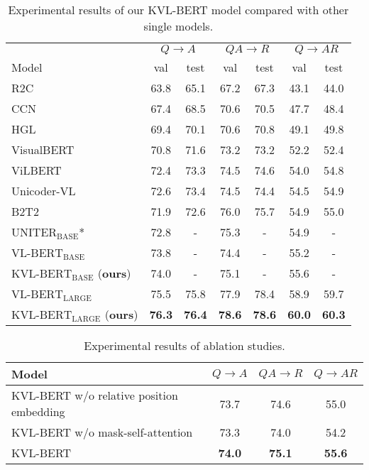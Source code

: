 \documentclass[conference]{IEEEtran}
\begin{document}
\begin{table*}[htp]
\setlength{\abovecaptionskip}{0pt}
\setlength{\belowcaptionskip}{10pt}
\caption{Experimental results of our KVL-BERT model compared with other single models.}
\centering
\begin{tabular}{l|cccccc}
\hline
 & \multicolumn{2}{c}{$Q \rightarrow A$} & \multicolumn{2}{c}{$QA \rightarrow R$} & \multicolumn{2}{c}{$Q \rightarrow AR$} \\
 Model& val &test&val&test&val&test\\
  \hline
R2C \cite{b10} & 63.8 & 65.1 & 67.2 & 67.3& 43.1 &44.0\\  
CCN \cite{b17} &67.4 & 68.5 & 70.6 & 70.5 & 47.7 & 48.4\\
HGL \cite{b18} & 69.4&	70.1&	70.6&	70.8	&49.1&	49.8 \\

\hline
VisualBERT \cite{b12} &70.8&	71.6	&73.2&	73.2&	52.2	&52.4\\
ViLBERT \cite{b13} &72.4	&73.3&	74.5&	74.6	&54.0&	54.8\\
Unicoder-VL \cite{b19} & 72.6	&73.4	&74.5&	74.4	&54.5&	54.9\\
B2T2 \cite{b15} & 71.9	&72.6	&76.0&	75.7	&54.9&	55.0\\
$\mathrm{UNITER}_{\mathrm{BASE}}$* \cite{b20} & 72.8 & - & 75.3 & - & 54.9 & - \\

\hline 
VL-$\mathrm{BERT}_{\mathrm{BASE}}$ \cite{b14} & 73.8 & - & 74.4 & - & 55.2 & - \\
KVL-$\mathrm{BERT}_{\mathrm{BASE}}$  (\textbf{ours}) &74.0 & - & 75.1 & - & 55.6& - \\
VL-$\mathrm{BERT}_{\mathrm{LARGE}}$ \cite{b14} & 75.5 & 75.8 & 77.9 &78.4 & 58.9 & 59.7 \\
KVL-$\mathrm{BERT}_{\mathrm{LARGE}}$  (\textbf{ours}) &\textbf{76.3}  & \textbf{76.4}&\textbf{78.6}  & \textbf{78.6} &\textbf{60.0}  & \textbf{60.3} \\
\hline
\end{tabular}
\label{tab2}
\end{table*}



\begin{table*}[htp]
\setlength{\abovecaptionskip}{0pt}
\setlength{\belowcaptionskip}{10pt}
\caption{Experimental results of ablation studies.}
\centering
\begin{tabular}{l|ccc}
\hline
Model& $Q \rightarrow A$ & $QA \rightarrow R$ & $Q \rightarrow AR$  \\
\hline
KVL-BERT w/o relative position embedding& 73.7 & 74.6& 55.0 \\
KVL-BERT w/o mask-self-attention& 73.3& 74.0 & 54.2 \\
KVL-BERT & \textbf{74.0}& \textbf{75.1}& \textbf{55.6} \\




\hline
\end{tabular}
\label{tab_ablation}
\end{table*}
\end{document}
